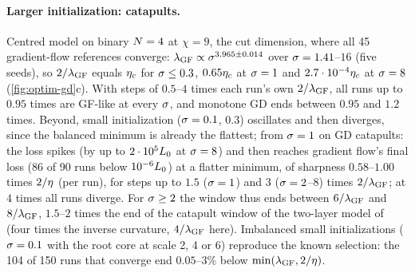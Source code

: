 \paragraph{Larger initialization: catapults.}
\empirical{}  Centred model on binary $N=4$ at $\chi=9$, the cut dimension, where all 45 gradient-flow references
converge: $\lambda_{\rm GF}\propto\sigma^{3.965\pm0.014}$ over $\sigma=1.41$--$16$ (five seeds), so $2/\lambda_{\rm GF}$ equals
$\eta_c$ for $\sigma\le0.3$, $0.65\eta_c$ at $\sigma=1$ and $2.7\cdot10^{-4}\eta_c$ at $\sigma=8$ (\cref{fig:optim-gd}c). With steps
of $0.5$--$4$ times each run's own $2/\lambda_{\rm GF}$, all runs up to $0.95$ times are GF-like at every $\sigma$, and
monotone GD ends between $0.95$ and $1.2$ times. Beyond, small initialization ($\sigma=0.1$, $0.3$) oscillates and then
diverges, since the balanced minimum is already the flattest; from $\sigma=1$ on GD catapults: the loss spikes (by up
to $2\cdot10^5L_0$ at $\sigma=8$) and then reaches gradient flow's final loss (86 of 90 runs below $10^{-6}L_0$)
at a flatter minimum, of sharpness $0.58$--$1.00$ times $2/\eta$ (per run), for steps up to $1.5$ ($\sigma=1$) and $3$
($\sigma=2$--$8$) times $2/\lambda_{\rm GF}$; at $4$ times all runs diverge. For $\sigma\ge2$ the window thus ends between
$6/\lambda_{\rm GF}$ and $8/\lambda_{\rm GF}$, $1.5$--$2$ times the end of the catapult window of the two-layer model
of \citet{lewkowycz2020large} (four times the inverse curvature, $4/\lambda_{\rm GF}$ here). Imbalanced small initializations ($\sigma=0.1$ with the root core at scale 2, 4 or 6)
reproduce the known selection: the 104 of 150 runs that converge end $0.05$--$3\%$ below
$\min(\lambda_{\rm GF},2/\eta)$.

